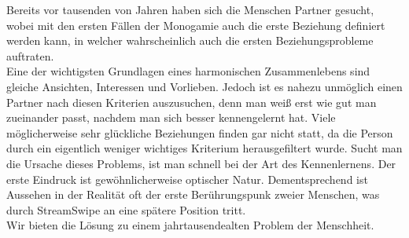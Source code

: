 
Bereits vor tausenden von Jahren haben sich die Menschen Partner gesucht, wobei mit den ersten Fällen der Monogamie auch die erste Beziehung definiert werden kann, in welcher wahrscheinlich auch die ersten Beziehungsprobleme auftraten.\\
Eine der wichtigsten Grundlagen eines harmonischen Zusammenlebens sind gleiche Ansichten, Interessen und Vorlieben. Jedoch ist es nahezu unmöglich einen Partner nach diesen Kriterien  auszusuchen, denn man weiß erst wie gut man zueinander passt, nachdem man sich besser kennengelernt hat. Viele möglicherweise sehr glückliche Beziehungen finden gar nicht statt, da die Person durch ein eigentlich weniger wichtiges Kriterium herausgefiltert wurde. Sucht man die Ursache dieses Problems, ist man schnell bei der Art des Kennenlernens. Der erste Eindruck ist gewöhnlicherweise optischer Natur. Dementsprechend ist Aussehen in der Realität oft der erste Berührungspunk zweier Menschen, was durch StreamSwipe an eine spätere  Position tritt.\\
Wir bieten die Lösung zu einem jahrtausendealten Problem der Menschheit.

